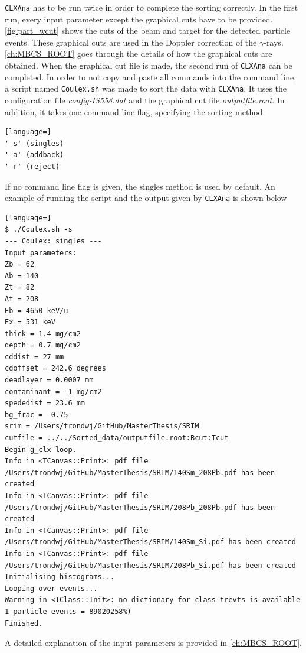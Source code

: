 \documentclass[twoside,english]{uiofysmaster/uiofysmaster}
\newcommand{\ga}{$\gamma$}
\let\orgautoref\autoref
\renewcommand{\autoref}
        {%
		 \def\sectionautorefname{Section}%
		 \def\subsectionautorefname{Section}%
		 \def\subsubsectionautorefname{Section}%
		 \def\chapterautorefname{Chapter}%
          \orgautoref}
\begin{document}
\texttt{CLXAna} has to be run twice in order to complete the sorting correctly.
In the first run, every input parameter except the graphical cuts have to be provided.
\autoref{fig:part_wcut} shows the cuts of the beam and target for the detected particle events.
These graphical cuts are used in the Doppler correction of the \ga-rays.
\autoref{ch:MBCS_ROOT} goes through the details of how the graphical cuts are obtained.
When the graphical cut file is made, the second run of \texttt{CLXAna} can be completed. 
In order to not copy and paste all commands into the command line, a script named \texttt{Coulex.sh} was made to sort the data with \texttt{CLXAna}. 
It uses the configuration file \textit{config-IS558.dat} and the graphical cut file \textit{outputfile.root}. 
In addition, it takes one command line flag, specifying the sorting method:
\begin{lstlisting}[language=]
'-s' (singles) 
'-a' (addback) 
'-r' (reject)
\end{lstlisting}
If no command line flag is given, the singles method is used by default.
An example of running the script and the output given by \texttt{CLXAna} is shown below
\begin{lstlisting}[language=]
$ ./Coulex.sh -s
--- Coulex: singles ---
Input parameters:
Zb = 62
Ab = 140
Zt = 82
At = 208
Eb = 4650 keV/u
Ex = 531 keV
thick = 1.4 mg/cm2
depth = 0.7 mg/cm2
cddist = 27 mm
cdoffset = 242.6 degrees
deadlayer = 0.0007 mm
contaminant = -1 mg/cm2
spededist = 23.6 mm
bg_frac = -0.75
srim = /Users/trondwj/GitHub/MasterThesis/SRIM
cutfile = ../../Sorted_data/outputfile.root:Bcut:Tcut
Begin g_clx loop.
Info in <TCanvas::Print>: pdf file /Users/trondwj/GitHub/MasterThesis/SRIM/140Sm_208Pb.pdf has been created
Info in <TCanvas::Print>: pdf file /Users/trondwj/GitHub/MasterThesis/SRIM/208Pb_208Pb.pdf has been created
Info in <TCanvas::Print>: pdf file /Users/trondwj/GitHub/MasterThesis/SRIM/140Sm_Si.pdf has been created
Info in <TCanvas::Print>: pdf file /Users/trondwj/GitHub/MasterThesis/SRIM/208Pb_Si.pdf has been created
Initialising histograms...
Looping over events...
Warning in <TClass::Init>: no dictionary for class trevts is available
1-particle events = 89020258%)    
Finished.
\end{lstlisting}
A detailed explanation of the input parameters is provided in \autoref{ch:MBCS_ROOT}.
\end{document}
